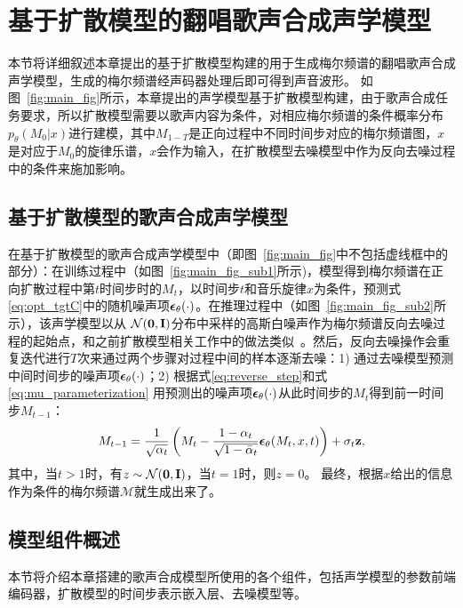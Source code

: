 \section{基于扩散模型的翻唱歌声合成声学模型}
本节将详细叙述本章提出的基于扩散模型构建的用于生成梅尔频谱的翻唱歌声合成声学模型，生成的梅尔频谱经声码器处理后即可得到声音波形。
如图~\ref{fig:main_fig}所示，本章提出的声学模型基于扩散模型构建，由于歌声合成任务要求，所以扩散模型需要以歌声内容为条件，对相应梅尔频谱的条件概率分布$p_\theta(M_{0}|x)$进行建模，其中$M_{1-T}$是正向过程中不同时间步对应的梅尔频谱图，$x$是对应于$M_0$的旋律乐谱，$x$会作为输入，在扩散模型去噪模型中作为反向去噪过程中的条件来施加影响。
\subsection{基于扩散模型的歌声合成声学模型}
\label{sec:naive_diffsinger}
在基于扩散模型的歌声合成声学模型中（即图~\ref{fig:main_fig}中不包括虚线框中的部分）：在训练过程中（如图~\ref{fig:main_fig_sub1}所示)，模型得到梅尔频谱在正向扩散过程中第$t$时间步时的$M_t$，以时间步$t$和音乐旋律$x$为条件，预测式\eqref{eq:opt_tgtC}中的随机噪声项${\boldsymbol{\epsilon}}_\theta(\cdot)$。在推理过程中（如图~\ref{fig:main_fig_sub2}所示），该声学模型以从
$\mathcal{N}(\mathbf{0}, \mathbf{I})$分布中采样的高斯白噪声作为梅尔频谱反向去噪过程的起始点，和之前扩散模型相关工作中的做法类似~\citep{Ho2020ddpm,kong2021diffwave}。然后，反向去噪操作会重复迭代进行$T$次来通过两个步骤对过程中间的样本逐渐去噪：1) 通过去噪模型预测中间时间步的噪声项${\boldsymbol{\epsilon}}_\theta(\cdot)$；2) 根据式\eqref{eq:reverse_step}和式\eqref{eq:mu_parameterization}
用预测出的噪声项${\boldsymbol{\epsilon}}_\theta(\cdot)$从此时间步的$M_t$得到前一时间步$M_{t-1}$：
\begin{equation}
    M_{t-1} = \frac{1}{\sqrt{\alpha_t}}\left( M_t - \frac{1-\alpha_t}{\sqrt{1-\bar\alpha_t}} {\boldsymbol{\epsilon}}_\theta(M_t, x, t) \right) + \sigma_t \mathbf{z},
\end{equation}
其中，当$t>1$时，有$z\sim\mathcal{N}(\mathbf{0}, \mathbf{I})$，当$t=1$时，则$z=0$。
最终，根据$x$给出的信息作为条件的梅尔频谱$\mathcal{M}$就生成出来了。
\subsection{模型组件概述}
本节将介绍本章搭建的歌声合成模型所使用的各个组件，包括声学模型的参数前端编码器，扩散模型的时间步表示嵌入层、去噪模型等。

